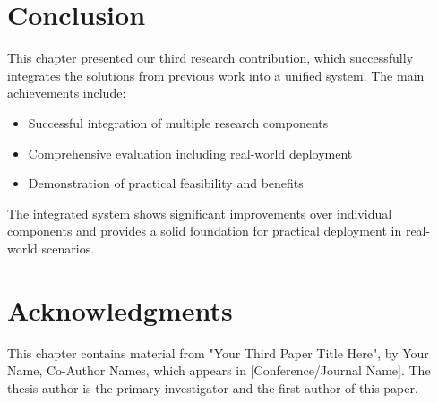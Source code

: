 \section{Conclusion}

This chapter presented our third research contribution, which successfully integrates the solutions from previous work into a unified system. The main achievements include:
\begin{itemize}
    \item Successful integration of multiple research components
    \item Comprehensive evaluation including real-world deployment
    \item Demonstration of practical feasibility and benefits
\end{itemize}

The integrated system shows significant improvements over individual components and provides a solid foundation for practical deployment in real-world scenarios.

\section*{Acknowledgments}
This chapter contains material from "Your Third Paper Title Here", by Your Name, Co-Author Names, which appears in [Conference/Journal Name]. The thesis author is the primary investigator and the first author of this paper. 